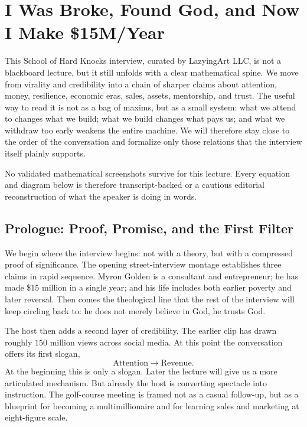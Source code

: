 \chapter{I Was Broke, Found God, and Now I Make \$15M/Year}

This School of Hard Knocks interview, curated by LazyingArt LLC, is not a blackboard lecture, but it still unfolds with a clear mathematical spine. We move from virality and credibility into a chain of sharper claims about attention, money, resilience, economic eras, sales, assets, mentorship, and trust. The useful way to read it is not as a bag of maxims, but as a small system: what we attend to changes what we build; what we build changes what pays us; and what we withdraw too early weakens the entire machine. We will therefore stay close to the order of the conversation and formalize only those relations that the interview itself plainly supports.

\begin{remark}
No validated mathematical screenshots survive for this lecture. Every equation and diagram below is therefore transcript-backed or a cautious editorial reconstruction of what the speaker is doing in words.
\end{remark}

\section{Prologue: Proof, Promise, and the First Filter}

We begin where the interview begins: not with a theory, but with a compressed proof of significance. The opening street-interview montage establishes three claims in rapid sequence. Myron Golden is a consultant and entrepreneur; he has made \$15 million in a single year; and his life includes both earlier poverty and later reversal. Then comes the theological line that the rest of the interview will keep circling back to: he does not merely believe in God, he trusts God.

The host then adds a second layer of credibility. The earlier clip has drawn roughly \(150\) million views across social media. At this point the conversation offers its first slogan,
\begin{equation}
\text{Attention} \rightarrow \text{Revenue}.
\end{equation}
At the beginning this is only a slogan. Later the lecture will give us a more articulated mechanism. But already the host is converting spectacle into instruction. The golf-course meeting is framed not as a casual follow-up, but as a blueprint for becoming a multimillionaire and for learning sales and marketing at eight-figure scale.

